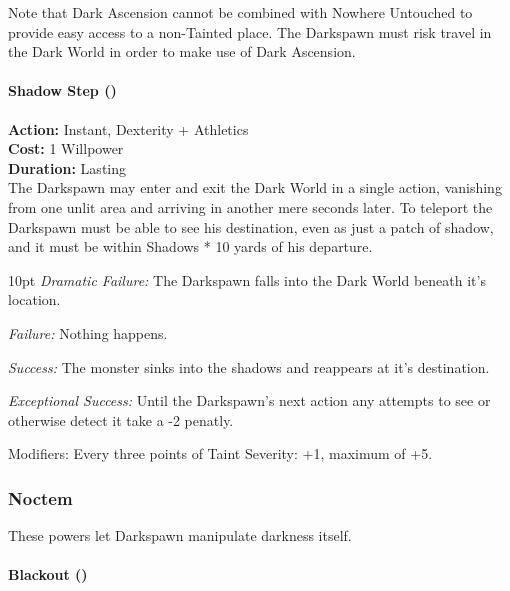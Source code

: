 Note that Dark Ascension cannot be combined with Nowhere Untouched to provide easy access to a non-Tainted place. The Darkspawn must risk travel in the Dark World in order to make use of Dark Ascension.\\

\paragraph*{Shadow Step (\textbullet\textbullet\textbullet\textbullet\textbullet)} 

\noindent \textbf{Action:} Instant, Dexterity + Athletics\\

\noindent \textbf{Cost:} 1 Willpower\\

\noindent \textbf{Duration:} Lasting \\

\noindent The Darkspawn may enter and exit the Dark World in a single action, vanishing from one unlit area and arriving in another mere seconds later. To teleport the Darkspawn must be able to see his destination, even as just a patch of shadow, and it must be within Shadows * 10 yards of his departure.

\begin{myindentpar}{10pt} \emph{Dramatic Failure:} The Darkspawn falls into the Dark World beneath it's location. 

    \emph{Failure:} Nothing happens. 

    \emph{Success:} The monster sinks into the shadows and reappears at it's destination.

    \emph{Exceptional Success:} Until the Darkspawn's next action any attempts to see or otherwise detect it take a -2 penatly. 

    Modifiers: Every three points of Taint Severity: +1, maximum of +5. \end{myindentpar}


\subsubsection*{Noctem}

These powers let Darkspawn manipulate darkness itself. 

\paragraph*{Blackout (\textbullet)}

